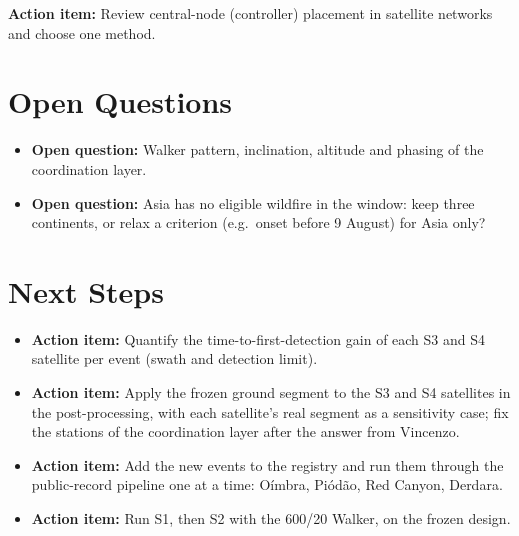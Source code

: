 \documentclass[11pt]{article}
\newcommand{\openquestion}[1]{\textcolor{openq}{\textbf{Open question:}} #1}
\newcommand{\actionitem}[1]{\textcolor{todo}{\textbf{Action item:}} #1}
\begin{document}
\actionitem{Review central-node (controller) placement in satellite networks and choose one method.}

\section{Open Questions}\label{sec:open3}

\begin{itemize}[leftmargin=1.2cm]
    \item \openquestion{Walker pattern, inclination, altitude and phasing of the coordination layer.}
    \item \openquestion{Asia has no eligible wildfire in the window: keep three continents, or relax a criterion (e.g.\ onset before 9 August) for Asia only?}
\end{itemize}

\section{Next Steps}\label{sec:next3}

\begin{itemize}[leftmargin=1.2cm]
    \item \actionitem{Quantify the time-to-first-detection gain of each S3 and S4 satellite per event (swath and detection limit).}
    \item \actionitem{Apply the frozen ground segment to the S3 and S4 satellites in the post-processing, with each satellite's real segment as a sensitivity case; fix the stations of the coordination layer after the answer from Vincenzo.}
    \item \actionitem{Add the new events to the registry and run them through the public-record pipeline one at a time: O\'imbra, Pi\'od\~ao, Red Canyon, Derdara.}
    \item \actionitem{Run S1, then S2 with the 600/20 Walker, on the frozen design.}
\end{itemize}

\printbibliography
\end{document}
